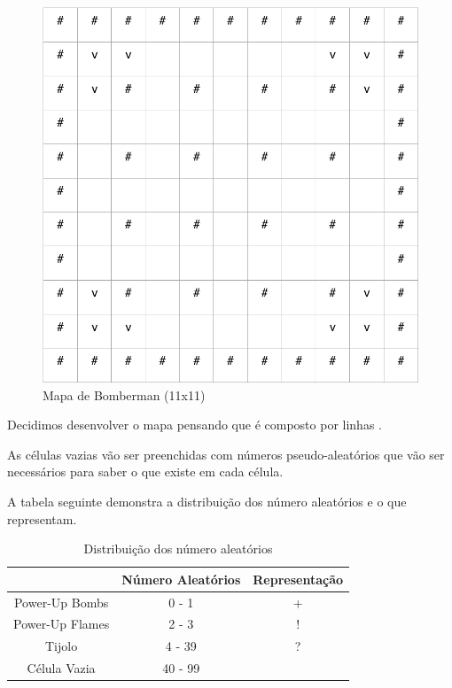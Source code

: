 \documentclass[a4paper]{article}
\begin{document}
\noindent
\begin{figure}[!htb]
      \centering
      \includegraphics[scale = 0.5]{Mapa.png}
      \caption{Mapa de Bomberman (11x11)}
      \label{Rotulo}
\end{figure}

Decidimos desenvolver o mapa pensando que é composto por linhas .\par
As células vazias vão ser preenchidas com números pseudo-aleatórios que vão ser necessários para saber o que existe em cada célula. 

\newpage 

A tabela seguinte demonstra a distribuição dos número aleatórios e o que representam.

\begin{table}[H]
      \centering
      \caption{Distribuição dos número aleatórios}
      \label{my-label}
\begin{tabular}{|c|c|c|}
      \hline
\multicolumn{1}{|l|}{} & \multicolumn{1}{l|}{Número Aleatórios} & \multicolumn{1}{l|}{Representação} \\ \hline
Power-Up Bombs         & 0 - 1                                  & +                                  \\ \hline
Power-Up Flames        & 2 - 3                                  & !                                  \\ \hline
Tijolo                 & 4 - 39                                 & ?                                  \\ \hline
Célula Vazia           & 40 - 99                                & \multicolumn{1}{l|}{}              \\ \hline
\end{tabular}
\end{table}
\end{document}
